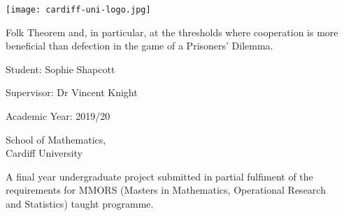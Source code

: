 \begin{titlepage}
	\begin{center}
		\vspace*{0.5cm}
		\texttt{[image: cardiff-uni-logo.jpg]}

		\vspace{1cm}

		\huge
		Folk Theorem and, in particular, at the thresholds where cooperation is more beneficial than defection in the game of a 		Prisoners' Dilemma.

		\vspace{2cm}

		\large
		Student: Sophie Shapcott

		\vspace{0.5cm}

		Supervisor: Dr Vincent Knight

		\vspace{0.5cm}

		Academic Year: 2019/20
		
		\vspace{0.5cm}

		School of Mathematics, \\Cardiff University

		\vfill

		\normalsize
		A final year undergraduate project submitted in partial fulfiment of the\\ requirements for MMORS (Masters in Mathematics, Operational Research\\ and Statistics) taught programme.

	\end{center}
\end{titlepage}
